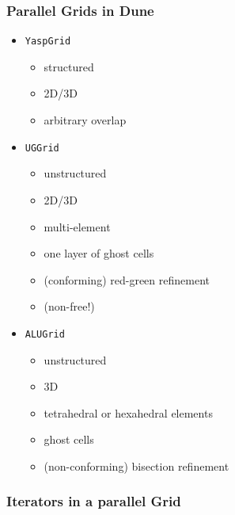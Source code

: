 \begin{frame}
  \frametitle<presentation>{Parallel Grids in Dune}
  \begin{itemize}
  \item<1-> \lstinline[basicstyle=\normalfont\ttfamily]!YaspGrid!
      \begin{itemize}
      \item structured
      \item 2D/3D
      \item arbitrary overlap
      \end{itemize}
  \item<2-> \lstinline[basicstyle=\normalfont\ttfamily]!UGGrid!
      \begin{itemize}
      \item unstructured
      \item 2D/3D
      \item multi-element
      \item one layer of ghost cells
      \item (conforming) red-green refinement
      \item (non-free!)
      \end{itemize}
  \item<3-> \lstinline[basicstyle=\normalfont\ttfamily]!ALUGrid!
      \begin{itemize}
      \item unstructured
      \item 3D
      \item tetrahedral or hexahedral elements
      \item ghost cells
      \item (non-conforming) bisection refinement
      \end{itemize}
  \end{itemize}
\end{frame}

\subsubsection{Iterators in a parallel Grid}

